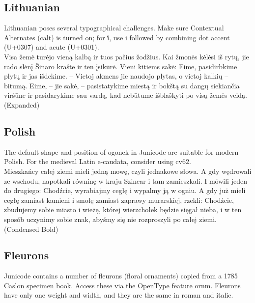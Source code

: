 \documentclass[12pt,letterpaper,openany]{book}
\begin{document}
\subsection*{Lithuanian}

{\small\semiconditalic Lithuanian poses several typographical challenges. Make sure
  Contextual Alternates (calt) is turned on; for i̇́, use i followed
  by combining dot accent (U+0307) and acute (U+0301).}\\[1ex]
{\wide{} Visa žemė turėjo vieną kalbą ir tuos pačius žodžius.  Kai žmonės
kėlėsi iš rytų, jie rado slėnį Šinaro krašte ir ten įsikūrė.  Vieni
kitiems sakė: Eime, pasidirbkime plytų ir jas išdekime. – Vietoj
akmens jie naudojo plytas, o vietoj kalkių – bitumą.  Eime, – jie
sakė, – pasistatykime miestą ir bokštą su dangų siekiančia viršūne ir
pasidarykime sau vardą, kad nebūtume išblaškyti po visą žemės veidą.} (Expanded)

\subsection*{Polish}
{\small\semiconditalic The default shape and position of ogonek in Junicode are suitable
for modern Polish. For the medieval Latin e-caudata, consider using
cv62.}\\[1ex]
{\condbold{} Mieszkańcy całej ziemi mieli jedną mowę, czyli jednakowe słowa.  A
gdy wędrowali ze wschodu, napotkali równinę w kraju Szinear i tam
zamieszkali.  I mówili jeden do drugiego: Chodźcie, wyrabiajmy cegłę
i wypalmy ją w ogniu. A gdy już mieli cegłę zamiast kamieni i smołę
zamiast zaprawy murarskiej, rzekli: Chodźcie, zbudujemy sobie miasto
i wieżę, której wierzchołek będzie sięgał nieba, i w ten sposób
uczynimy sobie znak, abyśmy się nie rozproszyli po całej ziemi.} (Condensed Bold)

\subsection*{Fleurons}

{\small\semiconditalic Junicode contains a number of fleurons (floral
  ornaments) copied from a 1785 Caslon specimen book. Access
  these via the OpenType feature \hyperlink{SectionD}{ornm}. Fleurons have only one weight and
  width, and they are the same in roman and italic.}

\begin{center}
\huge    \\
 \\[0.7ex]
\\[0.7ex]
\\
 
\end{center}
\end{document}
